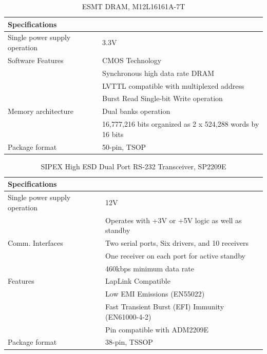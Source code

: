\begin{table}
    \centering
    \label{table:M12L16161A-7T}%
    \caption{ESMT DRAM, M12L16161A-7T \autocite{alldatasheet.comM12L16161A7TDatasheetPDF}}
    \begin{tabular}{|p{4cm}|p{12cm}|}
      \hline\rowcolor{gray!30}
  
      \textbf{Specifications} &  \\
      \hline
  
      Single power supply operation & 3.3V \\
      \hline
  
      Software Features & CMOS Technology \\
      & Synchronous high data rate DRAM \\
      & LVTTL compatible with multiplexed address \\
      & Burst Read Single-bit Write operation \\
      \hline
  
      Memory architecture & Dual banks operation \\
      & 16,777,216 bits organized as 2 x 524,288 words by 16 bits\\
      \hline
  
      Package format & 50-pin, TSOP \\
      \hline
  
    \end{tabular}
\end{table}

\begin{table}
    \centering
    \label{table:SP2209E}%
    \caption{SIPEX High ESD Dual Port RS-232 Transceiver, SP2209E \autocite{alldatasheet.comSP2209EDatasheetPDF}}
    \begin{tabular}{|p{4cm}|p{12cm}|}
      \hline\rowcolor{gray!30}
  
      \textbf{Specifications} &  \\
      \hline
  
      Single power supply operation & 12V \\
      & Operates with +3V or +5V logic as well as standby \\
      \hline

      Comm. Interfaces & Two serial ports, Six drivers, and 10 receivers \\
      & One receiver on each port for active standby \\
      & 460kbps minimum data rate \\
      \hline

      Features & LapLink Compatible \\
      & Low EMI Emissions (EN55022) \\
      & Fast Transient Burst (EFI) Immunity (EN61000-4-2) \\
      & Pin compatible with ADM2209E \\
      \hline
  
      Package format & 38-pin, TSSOP \\
      \hline
  
    \end{tabular}
\end{table}

